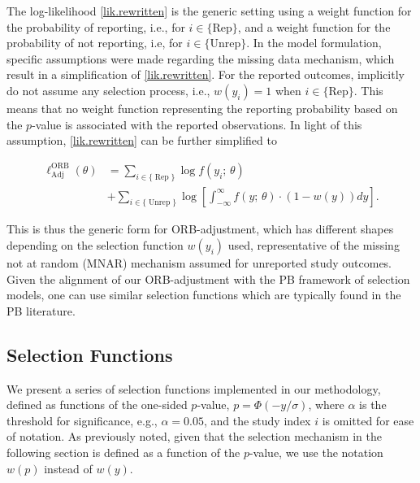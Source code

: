 \documentclass[twocolumn]{article}\usepackage[]{graphicx}\usepackage[]{xcolor}
\begin{document}
\bigskip


The log-likelihood \eqref{lik.rewritten} is the generic setting using a weight function for the probability of reporting, i.e., for $i \in \{\text{Rep} \}$, and a weight function for the probability of not reporting, i.e, for $i \in \{\text{Unrep} \}$. In the \citet{Copas2019} model formulation, specific assumptions were made regarding the missing data mechanism, which result in a simplification of \eqref{lik.rewritten}. For the reported outcomes, \citet{Copas2019} implicitly do not assume any selection process, i.e., $w(y_i)=1$ when $i \in \{\text{Rep} \}$. This means that no weight function representing the reporting probability based on the $p$-value is associated with the reported observations. In light of this assumption, \eqref{lik.rewritten} can be further simplified to


\begin{equation}
\label{lik.rewritten.special.copas.case}
\begin{aligned}
\ell_{\text{Adj}}^{\text{ORB}} \left(\theta \right) & = \sum_{i \in \{\operatorname{Rep} \} } \log f(y_i \text{; } \theta)\\
&+ \sum_{i \in \{ \operatorname{Unrep} \}} \log \left[ \int_{-\infty}^{\infty} f(y \text{; } \theta) \cdot \left( 1 - w(y) \right) d y \right] \text{.}
\end{aligned}
\end{equation}


This is thus the generic form for ORB-adjustment, which has different shapes depending on the selection function $w(y_i)$ used, representative of the missing not at random (MNAR) mechanism assumed for unreported study outcomes. Given the alignment of our ORB-adjustment with the PB framework of selection models, one can use similar selection functions which are typically found in the PB literature. 

\subsection{Selection Functions} \label{ourSELs}

We present a series of selection functions implemented in our methodology, defined as functions of the one-sided $p$-value, $p = \Phi(- y / \sigma)$, where $\alpha$ is the threshold for significance, e.g., $\alpha=0.05$, and the study index $i$ is omitted for ease of notation. As previously noted, given that the selection mechanism in the following section is defined as a function of the $p$-value, we use the notation $w(p)$ instead of $w(y)$. 
\end{document}

